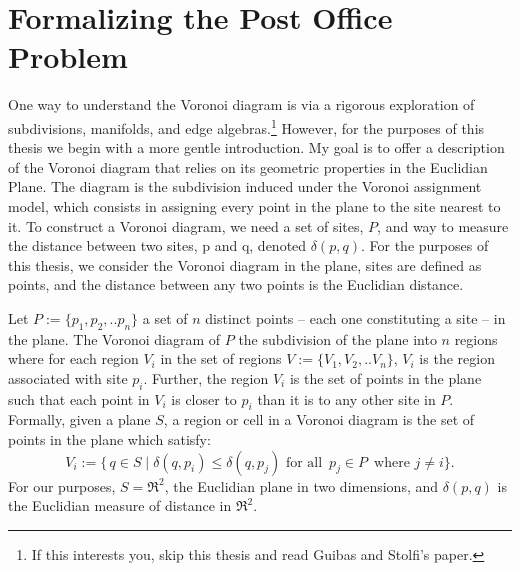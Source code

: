 \documentclass[12pt,twoside]{reedthesis}
\begin{document}
  \section{Formalizing the Post Office Problem} %
  \label{sec:formalizing_the_post_office_problem}
  One way to understand the Voronoi diagram is via a rigorous exploration of subdivisions, manifolds, and edge algebras.\footnote{If this interests you, skip this thesis and read Guibas and Stolfi's paper.\citep{}} However,  for the purposes of this thesis we begin with a more gentle introduction. My goal is to offer a description of the Voronoi diagram that relies on its geometric properties in the Euclidian Plane. The diagram is the subdivision induced under the Voronoi assignment model, which consists in assigning every point in the plane to the site nearest to it. To construct a Voronoi diagram, we need a set of sites, $P$, and way to measure the distance between two sites, p and q, denoted $\delta(p,q)$. For the purposes of this thesis, we consider the Voronoi diagram in the plane, sites are defined as points, and the distance between any two points is the Euclidian distance.\par
  Let $P:=\{p_{1}, p_{2}, .. p_{n}\}$ a set of $n$ distinct points -- each one constituting a site -- in the plane. The Voronoi diagram of $P$ the subdivision of the plane into $n$ regions where for each region $V_{i}$ in the set of regions $V:=\{V_{1}, V_{2}, .. V_{n}\}$, $V_{i}$ is the region associated with site $p_{i}$. Further, the region $V_{i}$ is the set of points in the plane such that each point in $V_{i}$ is closer to $p_{i}$ than it is to any other site in $P$. Formally, given a plane $S$, a region or cell in a Voronoi diagram is the set of points in the plane which satisfy:
  $$V_{i} := \{\,q \in S \mid \delta(q, p_{i}) \leq \delta(q, p_{j}) \text{ for all }\, p_{j}\in P\,\text{ where }j\neq i \}.$$
  For our purposes, $S= \Re^2$, the Euclidian plane in two dimensions, and $\delta(p, q)$ is the Euclidian measure of distance in $\Re^2$. \par
\end{document}
